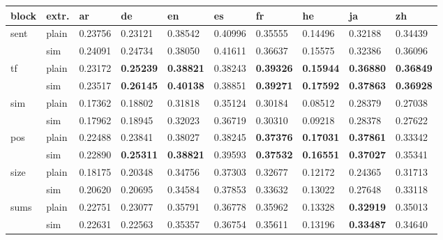 \begin{tabular}{llllllllll}
	
\hline\hline
block & extr. & ar & de & en & es & fr & he & ja & zh\\
\hline\hline

sent & plain & 0.23756 & 0.23121 & 0.38542 & 0.40996 & 0.35555 & 0.14496 & 0.32188 & 0.34439\\
& sim & 0.24091 & 0.24734 & 0.38050 & 0.41611 & 0.36637 & 0.15575 & 0.32386 & 0.36096\\
\hline

tf & plain & 0.23172 & \textbf{0.25239} & \textbf{0.38821} & 0.38243 & \textbf{0.39326} & \textbf{0.15944} & \textbf{0.36880} & \textbf{0.36849}\\
& sim & 0.23517 & \textbf{0.26145} & \textbf{0.40138} & 0.38851 & \textbf{0.39271} & \textbf{0.17592} & \textbf{0.37863} & \textbf{0.36928}\\

sim & plain & 0.17362 & 0.18802 & 0.31818 & 0.35124 & 0.30184 & 0.08512 & 0.28379 & 0.27038\\
& sim & 0.17962 & 0.18945 & 0.32023 & 0.36719 & 0.30310 & 0.09218 & 0.28378 & 0.27622\\

pos & plain & 0.22488 & 0.23841 & 0.38027 & 0.38245 & \textbf{0.37376} & \textbf{0.17031} & \textbf{0.37861} & 0.33342\\
& sim & 0.22890 & \textbf{0.25311} & \textbf{0.38821} & 0.39593 & \textbf{0.37532} & \textbf{0.16551} & \textbf{0.37027} & 0.35341\\

size & plain & 0.18175 & 0.20348 & 0.34756 & 0.37303 & 0.32677 & 0.12172 & 0.24365 & 0.31713\\
& sim & 0.20620 & 0.20695 & 0.34584 & 0.37853 & 0.33632 & 0.13022 & 0.27648 & 0.33118\\

sums & plain & 0.22751 & 0.23077 & 0.35791 & 0.36778 & 0.35962 & 0.13328 & \textbf{0.32919} & 0.35013\\
& sim & 0.22631 & 0.22563 & 0.35357 & 0.36754 & 0.35611 & 0.13196 & \textbf{0.33487} & 0.34640\\

\hline\hline
\end{tabular} 